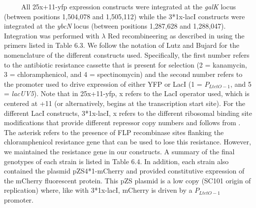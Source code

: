 \documentclass[12pt]{caltech_thesis}
\begin{document}
~~~~~All 25x+11-yfp expression constructs were integrated at the
\emph{galK} locus (between positions 1,504,078 and 1,505,112) while the
3*1x-lacI constructs were integrated at the \emph{ybcN} locus (between
positions 1,287,628 and 1,288,047). Integration was performed with
\(\lambda\) Red recombineering \autocite{sharan2009} as described in
\textcite{garcia2011} using the primers listed in Table 6.3. We follow
the notation of Lutz and Bujard \autocite{lutz1997} for the nomenclature
of the different constructs used. Specifically, the first number refers
to the antibiotic resistance cassette that is present for selection (2 =
kanamycin, 3 = chloramphenicol, and 4 = spectinomycin) and the second
number refers to the promoter used to drive expression of either YFP or
LacI (1 = \(P_{LtetO-1}\), and 5 = \emph{lacUV5}). Note that in
25x+11-yfp, x refers to the LacI operator used, which is centered at +11
(or alternatively, begins at the transcription start site). For the
different LacI constructs, 3*1x-lacI, x refers to the different
ribosomal binding site modifications that provide different repressor
copy numbers and follows from \textcite{garcia2011}. The asterisk refers
to the presence of FLP recombinase sites flanking the chloramphenicol
resistance gene that can be used to lose this resistance. However, we
maintained the resistance gene in our constructs. A summary of the final
genotypes of each strain is listed in Table 6.4. In addition, each
strain also contained the plasmid pZS4*1-mCherry and provided
constitutive expression of the mCherry fluorescent protein. This pZS
plasmid is a low copy (SC101 origin of replication) where, like with
3*1x-lacI, mCherry is driven by a \(P_{LtetO-1}\) promoter.
\end{document}
